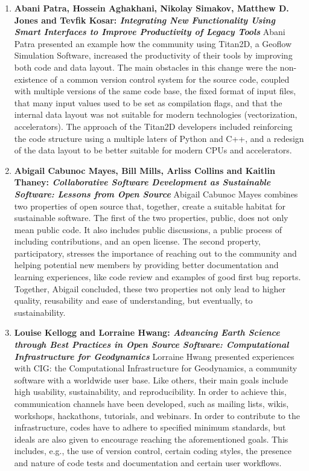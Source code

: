 \documentclass[11pt, oneside]{amsart}
\begin{document}
\begin{enumerate}
\item \textbf{Abani Patra, Hossein Aghakhani, Nikolay Simakov, Matthew D. Jones
and Tevfik Kosar: \textit{Integrating New Functionality Using Smart Interfaces to
Improve Productivity of Legacy Tools}}
Abani Patra presented an example how the community using Titan2D, a Geoflow
Simulation Software, increased the productivity of their tools by improving
both code and data layout. The main obstacles in this change were the non-existence
of a common version control system for the source code, coupled with multiple
versions of the same code base, the fixed format of input files, that many
input values used to be set as compilation flags, and that the internal data
layout was not suitable for modern technologies (vectorization, accelerators).
The approach of the Titan2D developers included reinforcing the code structure
using a multiple laters of Python and C++, and a redesign of the data layout to
be better suitable for modern CPUs and accelerators.

\item \textbf{Abigail Cabunoc Mayes, Bill Mills, Arliss Collins and Kaitlin
Thaney: \textit{Collaborative Software Development as Sustainable Software: Lessons
from Open Source}}
Abigail Cabunoc Mayes combines two properties of open source that, together,
create a suitable habitat for sustainable software. The first of the two
properties, public, does not only mean public code. It also includes
public discussions, a public process of including contributions, and an open
license. The second property, participatory, stresses the importance of
reaching out to the community and helping potential new members by providing
better documentation and learning experiences, like code review and examples of
good first bug reports. Together, Abigail concluded, these two properties not
only lead to higher quality, reusability and ease of understanding, but
eventually, to sustainability.

\item \textbf{Louise Kellogg and Lorraine Hwang: \textit{Advancing Earth Science
through Best Practices in Open Source Software: Computational Infrastructure
for Geodynamics}}
Lorraine Hwang presented experiences with CIG: the Computational Infrastructure
for Geodynamics, a community software with a worldwide user base. Like others,
their main goals include high usability, sustainability, and reproducibility.
In order to achieve this, communication channels have been developed, such as
mailing lists, wikis, workshops, hackathons, tutorials, and webinars. In order
to contribute to the infrastructure, codes have to adhere to specified minimum
standards, but ideals are also given to encourage reaching the aforementioned
goals. This includes, e.g., the use of version control, certain coding styles,
the presence and nature of code tests and documentation and certain user
workflows.


\end{enumerate}
\end{document}
